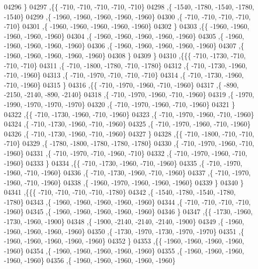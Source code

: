 \begin{DoxyCode}
04296     \}
04297    ,\{\{  -710,  -710,  -710,  -710,  -710\}
04298     ,\{ -1540, -1780, -1540, -1780, -1540\}
04299     ,\{ -1960, -1960, -1960, -1960, -1960\}
04300     ,\{  -710,  -710,  -710,  -710,  -710\}
04301     ,\{ -1960, -1960, -1960, -1960, -1960\}
04302     \}
04303    ,\{\{ -1960, -1960, -1960, -1960, -1960\}
04304     ,\{ -1960, -1960, -1960, -1960, -1960\}
04305     ,\{ -1960, -1960, -1960, -1960, -1960\}
04306     ,\{ -1960, -1960, -1960, -1960, -1960\}
04307     ,\{ -1960, -1960, -1960, -1960, -1960\}
04308     \}
04309    \}
04310   ,\{\{\{  -710, -1730,  -710,  -710,  -710\}
04311     ,\{  -710, -1800, -1780,  -710, -1780\}
04312     ,\{  -710, -1730, -1960,  -710, -1960\}
04313     ,\{  -710, -1970,  -710,  -710,  -710\}
04314     ,\{  -710, -1730, -1960,  -710, -1960\}
04315     \}
04316    ,\{\{  -710, -1970, -1960,  -710, -1960\}
04317     ,\{  -890, -2150, -2140,  -890, -2140\}
04318     ,\{  -710, -1970, -1960,  -710, -1960\}
04319     ,\{ -1970, -1990, -1970, -1970, -1970\}
04320     ,\{  -710, -1970, -1960,  -710, -1960\}
04321     \}
04322    ,\{\{  -710, -1730, -1960,  -710, -1960\}
04323     ,\{  -710, -1970, -1960,  -710, -1960\}
04324     ,\{  -710, -1730, -1960,  -710, -1960\}
04325     ,\{  -710, -1970, -1960,  -710, -1960\}
04326     ,\{  -710, -1730, -1960,  -710, -1960\}
04327     \}
04328    ,\{\{  -710, -1800,  -710,  -710,  -710\}
04329     ,\{ -1780, -1800, -1780, -1780, -1780\}
04330     ,\{  -710, -1970, -1960,  -710, -1960\}
04331     ,\{  -710, -1970,  -710, -1960,  -710\}
04332     ,\{  -710, -1970, -1960,  -710, -1960\}
04333     \}
04334    ,\{\{  -710, -1730, -1960,  -710, -1960\}
04335     ,\{  -710, -1970, -1960,  -710, -1960\}
04336     ,\{  -710, -1730, -1960,  -710, -1960\}
04337     ,\{  -710, -1970, -1960,  -710, -1960\}
04338     ,\{ -1960, -1970, -1960, -1960, -1960\}
04339     \}
04340    \}
04341   ,\{\{\{  -710,  -710,  -710,  -710, -1780\}
04342     ,\{ -1540, -1780, -1540, -1780, -1780\}
04343     ,\{ -1960, -1960, -1960, -1960, -1960\}
04344     ,\{  -710,  -710,  -710,  -710, -1960\}
04345     ,\{ -1960, -1960, -1960, -1960, -1960\}
04346     \}
04347    ,\{\{ -1730, -1960, -1730, -1960, -1900\}
04348     ,\{ -1900, -2140, -2140, -2140, -1900\}
04349     ,\{ -1960, -1960, -1960, -1960, -1960\}
04350     ,\{ -1730, -1970, -1730, -1970, -1970\}
04351     ,\{ -1960, -1960, -1960, -1960, -1960\}
04352     \}
04353    ,\{\{ -1960, -1960, -1960, -1960, -1960\}
04354     ,\{ -1960, -1960, -1960, -1960, -1960\}
04355     ,\{ -1960, -1960, -1960, -1960, -1960\}
04356     ,\{ -1960, -1960, -1960, -1960, -1960\}

\end{DoxyCode}

